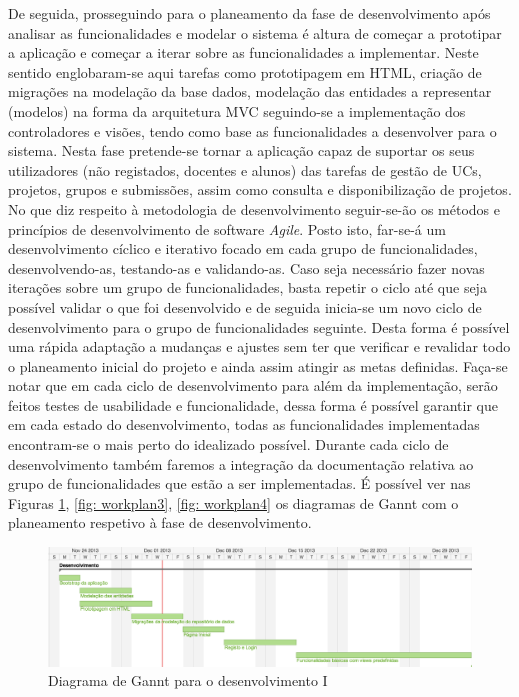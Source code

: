 De seguida, prosseguindo para o planeamento da fase de desenvolvimento após 
analisar as funcionalidades e modelar o sistema  é altura de começar a 
prototipar a aplicação e começar a iterar sobre as funcionalidades a 
implementar. Neste sentido englobaram-se aqui tarefas como prototipagem em HTML, 
criação de migrações na modelação da base dados, modelação das entidades a 
representar (modelos) na forma da arquitetura MVC seguindo-se a implementação dos 
controladores e visões, tendo como base as funcionalidades a desenvolver para o 
sistema. Nesta fase pretende-se tornar a aplicação capaz de suportar os seus 
utilizadores (não registados, docentes e alunos) das tarefas de gestão de UCs, 
projetos, grupos e submissões, assim como consulta e disponibilização de 
projetos. No que diz respeito à metodologia de desenvolvimento seguir-se-ão 
os métodos e princípios de desenvolvimento de software \textit{Agile}. Posto isto, 
far-se-á um desenvolvimento cíclico e iterativo focado em cada grupo de 
funcionalidades, desenvolvendo-as, testando-as e validando-as. Caso seja 
necessário fazer novas iterações sobre um grupo de funcionalidades, basta 
repetir o ciclo até que seja possível validar o que foi desenvolvido e de seguida inicia-se 
um novo ciclo de desenvolvimento para o grupo de funcionalidades seguinte.
Desta forma é possível uma rápida adaptação a mudanças e ajustes sem ter que verificar e 
revalidar todo o planeamento inicial do projeto e ainda assim atingir as metas 
definidas.
Faça-se notar que em cada ciclo de desenvolvimento para além da implementação,
 serão feitos testes de usabilidade e funcionalidade, dessa forma é possível garantir que em cada estado do 
desenvolvimento, todas as funcionalidades implementadas encontram-se o mais perto 
do idealizado possível.
Durante cada ciclo de desenvolvimento também faremos a integração da 
documentação relativa ao grupo de funcionalidades que estão a ser implementadas.
É possível ver nas Figuras \ref{fig: workplan2}, \ref{fig: workplan3}, \ref{fig: workplan4} 
os diagramas de Gannt com o planeamento respetivo à fase de desenvolvimento.

\begin{figure}[H] 
  \centering
  \includegraphics[width=1\textwidth]{images/plano_de_trabalho/gannt_2.png}
  \caption{Diagrama de Gannt para o desenvolvimento I}
  \label{fig: workplan2}
\end{figure}

